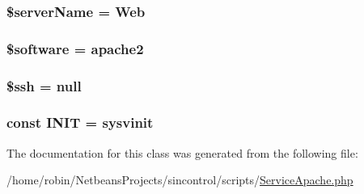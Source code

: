 \subsubsection[{\$server\+Name}]{\setlength{\rightskip}{0pt plus 5cm}\$server\+Name = \textquotesingle{}Web\textquotesingle{}\hspace{0.3cm}{\ttfamily [protected]}}\label{class_service_apache_ab05851c38639d62e5eb8c069a7f033df}
\hypertarget{class_service_apache_a9cd64e3508f6c0a0584ab9e759ad5fe1}{}
\subsubsection[{\$software}]{\setlength{\rightskip}{0pt plus 5cm}\$software = \textquotesingle{}apache2\textquotesingle{}\hspace{0.3cm}{\ttfamily [protected]}}\label{class_service_apache_a9cd64e3508f6c0a0584ab9e759ad5fe1}
\hypertarget{class_service_apache_ac5d5f66bf0113d0d35de8d8720b191fa}{}
\subsubsection[{\$ssh}]{\setlength{\rightskip}{0pt plus 5cm}\$ssh = null\hspace{0.3cm}{\ttfamily [protected]}}\label{class_service_apache_ac5d5f66bf0113d0d35de8d8720b191fa}
\hypertarget{class_service_apache_a57a69f62cb572acac15fa0e1a6cac3ee}{}
\subsubsection[{I\+N\+I\+T}]{\setlength{\rightskip}{0pt plus 5cm}const I\+N\+I\+T = \textquotesingle{}sysvinit\textquotesingle{}}\label{class_service_apache_a57a69f62cb572acac15fa0e1a6cac3ee}


The documentation for this class was generated from the following file\+:\begin{DoxyCompactItemize}
\item 
/home/robin/\+Netbeans\+Projects/sincontrol/scripts/\hyperlink{scripts_2_service_apache_8php}{Service\+Apache.\+php}\end{DoxyCompactItemize}

